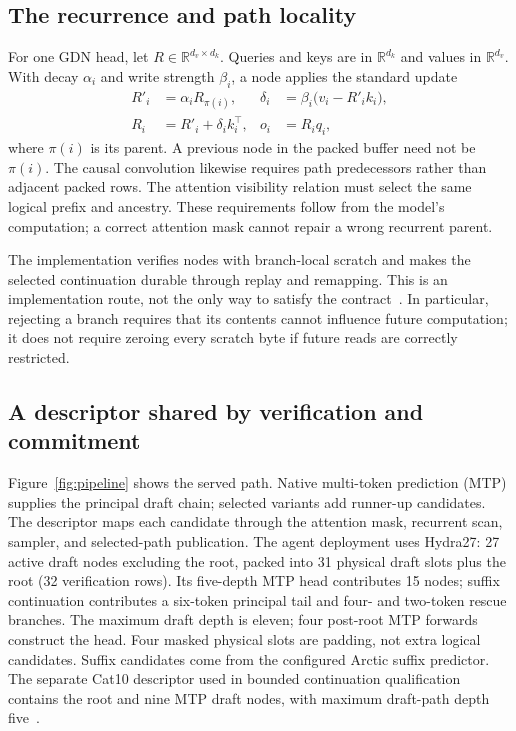 \documentclass[conference]{IEEEtran}
\begin{document}
\subsection{The recurrence and path locality}
For one GDN head, let $R\in\mathbb{R}^{d_v\times d_k}$. Queries and keys are in $\mathbb{R}^{d_k}$ and values in $\mathbb{R}^{d_v}$. With decay $\alpha_i$ and write strength $\beta_i$, a node applies the standard update~\cite{yang2024gated}
\begin{align}
R'_i &= \alpha_i R_{\pi(i)}, &
\delta_i &= \beta_i\bigl(v_i-R'_i k_i\bigr),\\
R_i &= R'_i+\delta_i k_i^\top, &
o_i &= R_iq_i,
\end{align}
where $\pi(i)$ is its parent. A previous node in the packed buffer need not be $\pi(i)$. The causal convolution likewise requires path predecessors rather than adjacent packed rows. The attention visibility relation must select the same logical prefix and ancestry. These requirements follow from the model's computation; a correct attention mask cannot repair a wrong recurrent parent.

The implementation verifies nodes with branch-local scratch and makes the selected continuation durable through replay and remapping. This is an implementation route, not the only way to satisfy the contract~\cite{lumo2026archive,lumo2026stateless}. In particular, rejecting a branch requires that its contents cannot influence future computation; it does not require zeroing every scratch byte if future reads are correctly restricted.

\subsection{A descriptor shared by verification and commitment}
Figure~\ref{fig:pipeline} shows the served path. Native multi-token prediction (MTP) supplies the principal draft chain; selected variants add runner-up candidates. The descriptor maps each candidate through the attention mask, recurrent scan, sampler, and selected-path publication. The agent deployment uses Hydra27: 27 active draft nodes excluding the root, packed into 31 physical draft slots plus the root (32 verification rows). Its five-depth MTP head contributes 15 nodes; suffix continuation contributes a six-token principal tail and four- and two-token rescue branches. The maximum draft depth is eleven; four post-root MTP forwards construct the head. Four masked physical slots are padding, not extra logical candidates. Suffix candidates come from the configured Arctic suffix predictor. The separate Cat10 descriptor used in bounded continuation qualification contains the root and nine MTP draft nodes, with maximum draft-path depth five~\cite{lumo2026archive}.
\end{document}
